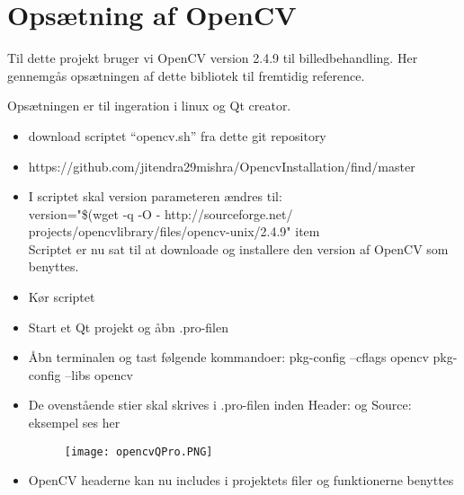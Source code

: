 \chapter{Opsætning af OpenCV}
\label{appendix:Opsaetning_af_opencv}

Til dette projekt bruger vi OpenCV version 2.4.9 til billedbehandling. Her gennemgås opsætningen af dette bibliotek til fremtidig reference.\newline

Opsætningen er til ingeration i linux og Qt creator. 
 
\begin{itemize}
  \item download scriptet “opencv.sh” fra dette git repository  
  \item https://github.com/jitendra29mishra/OpencvInstallation/find/master
  \item I scriptet skal version parameteren ændres til:\\  
  version="\$(wget -q -O - http://sourceforge.net/\\ projects/opencvlibrary/files/opencv-unix/2.4.9"
  item \\Scriptet er nu sat til at downloade og installere den version af OpenCV som benyttes. 
   \item Kør scriptet
   \item Start et Qt projekt og åbn .pro-filen 
   \item Åbn terminalen og tast følgende kommandoer: 
   \subitem pkg-config --cflags opencv
   \subitem pkg-config --libs opencv
   \item De ovenstående stier skal skrives i .pro-filen inden Header: og Source: eksempel ses her
     	
\begin{figure}[h] 
\centering
	\texttt{[image: opencvQPro.PNG]}
	\label{fig:qt_profil}
\end{figure}
  \item OpenCV headerne kan nu includes i projektets filer og funktionerne benyttes    	
    
\end{itemize}
